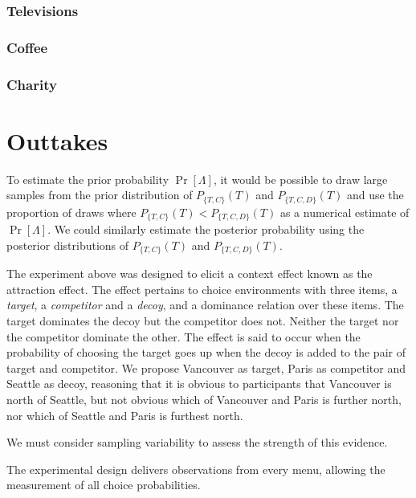 \documentclass[11pt,letter]{article}
\begin{document}
\subsubsection{Televisions}



\subsubsection{Coffee}



\subsubsection{Charity}



\iffalse

\section{Outtakes}

To estimate the prior probability $\Pr[\Lambda]$, it would be possible to draw large samples from the prior distribution of $P_{\{T,C\}}(T)$ and $P_{\{T,C,D\}}(T)$ and use the proportion of draws where $P_{\{T,C\}}(T) < P_{\{T,C,D\}}(T)$ as a numerical estimate of $\Pr[\Lambda]$.
We could similarly estimate the posterior probability using the posterior distributions of $P_{\{T,C\}}(T)$ and $P_{\{T,C,D\}}(T)$.

The experiment above was designed to elicit a context effect known as the attraction effect.
The effect pertains to choice environments with three items, a {\em target}, a {\em competitor} and a {\em decoy}, and a dominance relation over these items.
The target dominates the decoy but the competitor does not.
Neither the target nor the competitor dominate the other.
The effect is said to occur when the probability of choosing the target goes up when the decoy is added to the pair of target and competitor.
We propose Vancouver as target, Paris as competitor and Seattle as decoy, reasoning that it is obvious to participants that Vancouver is north of Seattle, but not obvious which of Vancouver and Paris is further north, nor which of Seattle and Paris is furthest north.

We must consider sampling variability to assess the strength of this evidence.

The experimental design delivers observations from every menu, allowing the measurement of all choice probabilities.
\end{document}
